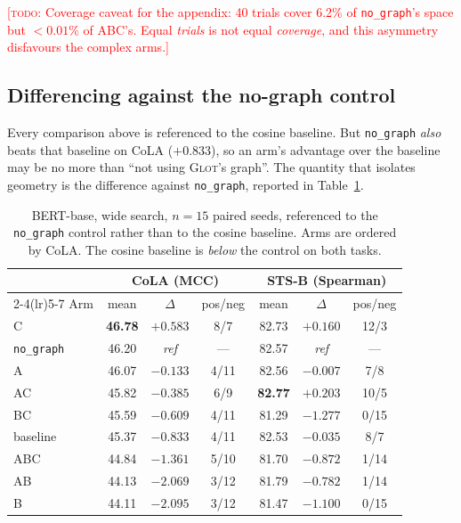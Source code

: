\documentclass{article} %
\newcommand{\TODO}[1]{\textcolor{red}{[\textsc{todo}: #1]}}
\begin{document}
\TODO{Coverage caveat for the appendix: 40 trials cover 6.2\% of
\texttt{no\_graph}'s space but $<0.01\%$ of ABC's. Equal \emph{trials} is not
equal \emph{coverage}, and this asymmetry disfavours the complex arms.}

\subsection{Differencing against the no-graph control}
\label{sec:vs-nograph}

Every comparison above is referenced to the cosine baseline. But
\texttt{no\_graph} \emph{also} beats that baseline on CoLA ($+0.833$), so an
arm's advantage over the baseline may be no more than ``not using
\textsc{Glot}'s graph''. The quantity that isolates geometry is the difference
against \texttt{no\_graph}, reported in Table~\ref{tab:vs-nograph}.

\begin{table}[t]
\caption{BERT-base, wide search, $n=15$ paired seeds, referenced to the
\texttt{no\_graph} control rather than to the cosine baseline. Arms are ordered
by CoLA. The cosine baseline is \emph{below} the control on both tasks.}
\label{tab:vs-nograph}
\begin{center}
\begin{tabular}{lcccccc}
\toprule
 & \multicolumn{3}{c}{CoLA (MCC)} & \multicolumn{3}{c}{STS-B (Spearman)} \\
\cmidrule(lr){2-4}\cmidrule(lr){5-7}
Arm & mean & $\Delta$ & pos/neg & mean & $\Delta$ & pos/neg \\
\midrule
C                  & \textbf{46.78} & $+0.583$ & 8/7   & 82.73 & $+0.160$ & 12/3 \\
\texttt{no\_graph} & 46.20 & \emph{ref} & ---         & 82.57 & \emph{ref} & --- \\
A                  & 46.07 & $-0.133$ & 4/11          & 82.56 & $-0.007$ & \phantom{0}7/8 \\
AC                 & 45.82 & $-0.385$ & 6/9           & \textbf{82.77} & $+0.203$ & 10/5 \\
BC                 & 45.59 & $-0.609$ & 4/11          & 81.29 & $-1.277$ & \phantom{0}0/15 \\
baseline           & 45.37 & $-0.833$ & 4/11          & 82.53 & $-0.035$ & \phantom{0}8/7 \\
ABC                & 44.84 & $-1.361$ & 5/10          & 81.70 & $-0.872$ & \phantom{0}1/14 \\
AB                 & 44.13 & $-2.069$ & 3/12          & 81.79 & $-0.782$ & \phantom{0}1/14 \\
B                  & 44.11 & $-2.095$ & 3/12          & 81.47 & $-1.100$ & \phantom{0}0/15 \\
\bottomrule
\end{tabular}
\end{center}
\end{table}
\end{document}
